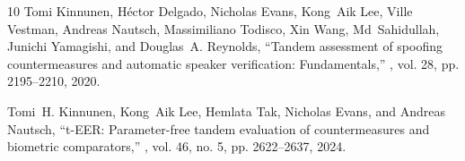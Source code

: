 \documentclass[10pt]{article}
\begin{document}
\begin{thebibliography}{10}
Tomi Kinnunen, H\'{e}ctor Delgado, Nicholas Evans, Kong~Aik Lee, Ville Vestman, Andreas Nautsch, Massimiliano Todisco, Xin Wang, Md~Sahidullah, Junichi Yamagishi, and Douglas~A. Reynolds,
\newblock ``Tandem assessment of spoofing countermeasures and automatic speaker verification: Fundamentals,''
, vol. 28, pp. 2195--2210, 2020.

Tomi~H. Kinnunen, Kong~Aik Lee, Hemlata Tak, Nicholas Evans, and Andreas Nautsch,
\newblock ``{t-EER}: Parameter-free tandem evaluation of countermeasures and biometric comparators,''
, vol. 46, no. 5, pp. 2622--2637, 2024.

\end{thebibliography}
\end{document}

